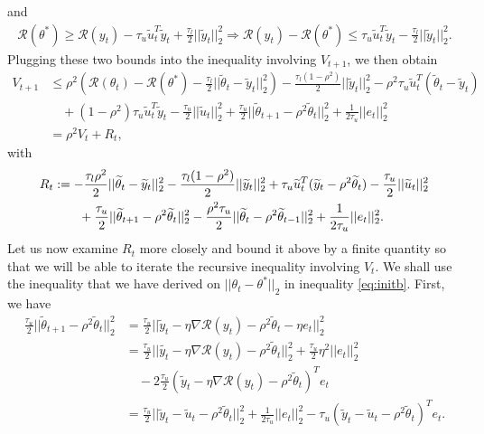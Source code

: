 \documentclass{article}
\begin{document}
and
\begin{align*}
\mathcal{R}(\theta^*) \geq \mathcal{R}(y_t) - \tau_u\widetilde{u}_t^T\widetilde{y}_t + \frac{\tau_l}{2}||\widetilde{y}_t||_2^2 \Rightarrow \mathcal{R}(y_t) - \mathcal{R}(\theta^*) \leq \tau_u\widetilde{u}_t^T\widetilde{y}_t - \frac{\tau_l}{2}||\widetilde{y}_t||_2^2.
\end{align*}
Plugging these two bounds into the inequality involving $V_{t + 1}$, we then obtain
\begin{align*}
V_{t + 1} &\leq \rho^2\left(\mathcal{R}(\theta_t) - \mathcal{R}(\theta^*) - \frac{\tau_l}{2}||\widetilde{\theta}_t - \widetilde{y}_t||_2^2\right) - \frac{\tau_l(1 - \rho^2)}{2}||\widetilde{y}_t||_2^2 - \rho^2\tau_u\widetilde{u}_t^T(\widetilde{\theta}_t - \widetilde{y}_t)\\
& \quad + (1 - \rho^2)\tau_u\widetilde{u}_t^T\widetilde{y}_t -\frac{\tau_u}{2}||\widetilde{u}_t||_2^2 + \frac{\tau_u}{2}||\widetilde{\theta}_{t + 1} - \rho^2\widetilde{\theta}_t||_2^2 + \frac{1}{2\tau_u}||e_t||_2^2\\
&=\rho^2V_t + R_t,
\end{align*}
with
\begin{align}
\label{EqnRt}
R_t &:= -\frac{\tau_l\rho^2}{2}||\widetilde{\theta}_t - \widetilde{y}_t||_2^2 - \frac{\tau_l(1 - \rho^2)}{2}||\widetilde{y}_t||_2^2 + \tau_u\widetilde{u}_t^T(\widetilde{y}_t - \rho^2\widetilde{\theta}_t) - \frac{\tau_u}{2}||\widetilde{u}_t||_2^2 \notag\\
& \qquad + \frac{\tau_u}{2}||\widetilde{\theta}_{t + 1} - \rho^2\widetilde{\theta}_t||_2^2 - \frac{\rho^2\tau_u}{2}||\widetilde{\theta}_t - \rho^2\widetilde{\theta}_{t - 1}||_2^2 + \frac{1}{2\tau_u}||e_t||_2^2.
\end{align}
Let us now examine $R_t$ more closely and bound it above by a finite quantity so that we will be able to iterate the recursive inequality involving $V_t$. We shall use the inequality that we have derived on $||\theta_t - \theta^*||_2$ in inequality \eqref{eq:initb}. First, we have
\begin{align*} 
\frac{\tau_u}{2}||\widetilde{\theta}_{t + 1} - \rho^2\widetilde{\theta}_t||_2^2 &= \frac{\tau_u}{2}||\widetilde{y}_t - \eta\nabla\mathcal{R}(y_t) -\rho^2\widetilde{\theta}_t - \eta e_t||_2^2\\
&= \frac{\tau_u}{2}||\widetilde{y_t} - \eta\nabla\mathcal{R}(y_t) -\rho^2\widetilde{\theta}_t||_2^2 + \frac{\tau_u}{2}\eta^2||e_t||_2^2\\
& \quad - 2\frac{\tau_u}{2}(\widetilde{y}_t - \eta\nabla\mathcal{R}(y_t) -\rho^2\widetilde{\theta}_t)^Te_t\\
&= \frac{\tau_u}{2}||\widetilde{y}_t - \widetilde{u}_t - \rho^2\widetilde{\theta}_t||_2^2 + \frac{1}{2\tau_u}||e_t||_2^2 - \tau_u(\widetilde{y}_t - \widetilde{u}_t - \rho^2\widetilde{\theta}_t)^Te_t.
\end{align*}
\end{document}
